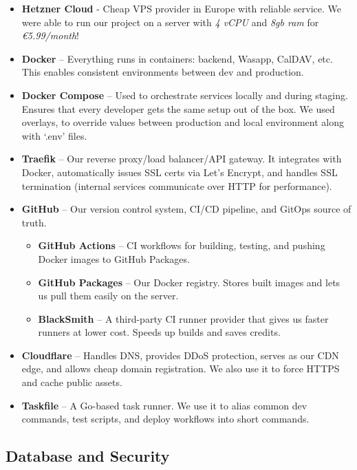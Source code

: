 \begin{itemize}
    \item \textbf{Hetzner Cloud} - Cheap VPS provider in Europe with reliable service. We were able to run our project on a server with \textit{4 vCPU} and \textit{8gb ram} for \textit{€5.99/month}!
    \item \textbf{Docker} – Everything runs in containers: backend, Wasapp, CalDAV, etc. This enables consistent environments between dev and production.
    \item \textbf{Docker Compose} – Used to orchestrate services locally and during staging. Ensures that every developer gets the same setup out of the box. We used overlays, to override values between production and local environment along with `.env' files.
    \item \textbf{Traefik} – Our reverse proxy/load balancer/API gateway. It integrates with Docker, automatically issues SSL certs via Let's Encrypt, and handles SSL termination (internal services communicate over HTTP for performance).
    \item \textbf{GitHub} – Our version control system, CI/CD pipeline, and GitOps source of truth.
    \begin{itemize}
        \item \textbf{GitHub Actions} – CI workflows for building, testing, and pushing Docker images to GitHub Packages.
        \item \textbf{GitHub Packages} – Our Docker registry. Stores built images and lets us pull them easily on the server.
        \item \textbf{BlackSmith} – A third-party CI runner provider that gives us faster runners at lower cost. Speeds up builds and saves credits.
    \end{itemize}
    \item \textbf{Cloudflare} – Handles DNS, provides DDoS protection, serves as our CDN edge, and allows cheap domain registration. We also use it to force HTTPS and cache public assets.
    \item \textbf{Taskfile} – A Go-based task runner. We use it to alias common dev commands, test scripts, and deploy workflows into short commands.
\end{itemize}

\subsection{Database and Security}

